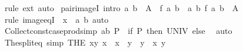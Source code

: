 \begin{isabellebody}
\ {\isacharparenleft}{\kern0pt}rule\ ext{\isacharparenright}{\kern0pt}\ auto%
\endisatagproof
{\isafoldproof}%
%
\isadelimproof
\isanewline
%
\endisadelimproof
\isanewline
{}\isamarkupfalse%
\ pair{\isacharunderscore}{\kern0pt}imageI\ {\isacharbrackleft}{\kern0pt}intro{\isacharbrackright}{\kern0pt}{\isacharcolon}{\kern0pt}\ {\isachardoublequoteopen}{\isacharparenleft}{\kern0pt}a{\isacharcomma}{\kern0pt}\ b{\isacharparenright}{\kern0pt}\ {\isasymin}\ A\ {\isasymLongrightarrow}\ f\ a\ b\ {\isasymin}\ {\isacharparenleft}{\kern0pt}{\isasymlambda}{\isacharparenleft}{\kern0pt}a{\isacharcomma}{\kern0pt}\ b{\isacharparenright}{\kern0pt}{\isachardot}{\kern0pt}\ f\ a\ b{\isacharparenright}{\kern0pt}\ {\isacharbackquote}{\kern0pt}\ A{\isachardoublequoteclose}\isanewline
%
\isadelimproof
\ \ %
\endisadelimproof
%
\isatagproof
{}\isamarkupfalse%
\ {\isacharparenleft}{\kern0pt}rule\ image{\isacharunderscore}{\kern0pt}eqI\ {\isacharbrackleft}{\kern0pt}\ x\ {\isacharequal}{\kern0pt}\ {\isachardoublequoteopen}{\isacharparenleft}{\kern0pt}a{\isacharcomma}{\kern0pt}\ b{\isacharparenright}{\kern0pt}{\isachardoublequoteclose}{\isacharbrackright}{\kern0pt}{\isacharparenright}{\kern0pt}\ auto%
\endisatagproof
{\isafoldproof}%
%
\isadelimproof
\isanewline
%
\endisadelimproof
\isanewline
{}\isamarkupfalse%
\ Collect{\isacharunderscore}{\kern0pt}const{\isacharunderscore}{\kern0pt}case{\isacharunderscore}{\kern0pt}prod{\isacharbrackleft}{\kern0pt}simp{\isacharbrackright}{\kern0pt}{\isacharcolon}{\kern0pt}\ {\isachardoublequoteopen}{\isacharbraceleft}{\kern0pt}{\isacharparenleft}{\kern0pt}a{\isacharcomma}{\kern0pt}b{\isacharparenright}{\kern0pt}{\isachardot}{\kern0pt}\ P{\isacharbraceright}{\kern0pt}\ {\isacharequal}{\kern0pt}\ {\isacharparenleft}{\kern0pt}if\ P\ then\ UNIV\ else\ {\isacharbraceleft}{\kern0pt}{\isacharbraceright}{\kern0pt}{\isacharparenright}{\kern0pt}{\isachardoublequoteclose}\isanewline
%
\isadelimproof
%
\endisadelimproof
%
\isatagproof
{}\isamarkupfalse%
\ auto%
\endisatagproof
{\isafoldproof}%
%
\isadelimproof
\isanewline
%
\endisadelimproof
\isanewline
{}\isamarkupfalse%
\ The{\isacharunderscore}{\kern0pt}split{\isacharunderscore}{\kern0pt}eq\ {\isacharbrackleft}{\kern0pt}simp{\isacharbrackright}{\kern0pt}{\isacharcolon}{\kern0pt}\ {\isachardoublequoteopen}{\isacharparenleft}{\kern0pt}THE\ {\isacharparenleft}{\kern0pt}x{\isacharprime}{\kern0pt}{\isacharcomma}{\kern0pt}y{\isacharprime}{\kern0pt}{\isacharparenright}{\kern0pt}{\isachardot}{\kern0pt}\ x\ {\isacharequal}{\kern0pt}\ x{\isacharprime}{\kern0pt}\ {\isasymand}\ y\ {\isacharequal}{\kern0pt}\ y{\isacharprime}{\kern0pt}{\isacharparenright}{\kern0pt}\ {\isacharequal}{\kern0pt}\ {\isacharparenleft}{\kern0pt}x{\isacharcomma}{\kern0pt}\ y{\isacharparenright}{\kern0pt}{\isachardoublequoteclose}\isanewline

\end{isabellebody}
